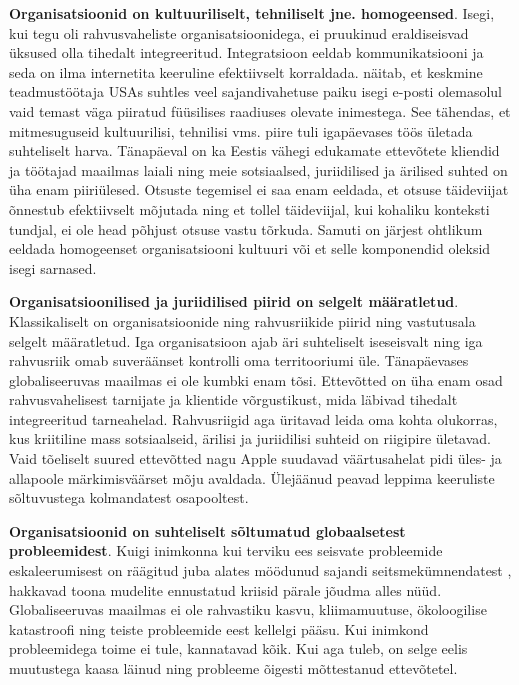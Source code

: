 \textbf{Organisatsioonid on kultuuriliselt, tehniliselt jne. homogeensed}. Isegi, kui tegu oli rahvusvaheliste organisatsioonidega, ei pruukinud eraldiseisvad üksused olla tihedalt integreeritud. Integratsioon eeldab kommunikatsiooni ja seda on ilma internetita keeruline efektiivselt korraldada. \citeauthor{cfmcommnetworks}\cite{cfmcommnetworks} näitab, et keskmine teadmustöötaja USAs suhtles veel sajandivahetuse paiku isegi e-posti olemasolul vaid temast väga piiratud füüsilises raadiuses olevate inimestega. See tähendas, et mitmesuguseid kultuurilisi, tehnilisi vms. piire tuli igapäevases töös ületada suhteliselt harva. Tänapäeval on ka Eestis vähegi edukamate ettevõtete kliendid ja töötajad maailmas laiali ning meie sotsiaalsed, juriidilised ja ärilised suhted on üha enam piiriülesed. Otsuste tegemisel ei saa enam eeldada, et otsuse täideviijat õnnestub efektiivselt mõjutada ning et tollel täideviijal, kui kohaliku konteksti tundjal, ei ole head põhjust otsuse vastu tõrkuda. Samuti on järjest ohtlikum eeldada homogeenset organisatsiooni kultuuri või et selle komponendid oleksid isegi sarnased.

\textbf{Organisatsioonilised ja juriidilised piirid on selgelt määratletud}. Klassikaliselt on organisatsioonide ning rahvusriikide piirid ning vastutusala selgelt määratletud. Iga organisatsioon ajab äri suhteliselt iseseisvalt ning iga rahvusriik omab suveräänset kontrolli oma territooriumi üle. Tänapäevases globaliseeruvas maailmas ei ole kumbki enam tõsi. Ettevõtted on üha enam osad rahvusvahelisest tarnijate ja klientide võrgustikust, mida läbivad tihedalt integreeritud tarneahelad. Rahvusriigid aga üritavad leida oma kohta olukorras, kus kriitiline mass sotsiaalseid, ärilisi ja juriidilisi suhteid on riigipire ületavad. Vaid tõeliselt suured ettevõtted nagu Apple suudavad väärtusahelat pidi üles- ja allapoole märkimisväärset mõju avaldada. Ülejäänud peavad leppima keeruliste sõltuvustega kolmandatest osapooltest. 

\textbf{Organisatsioonid on suhteliselt sõltumatud globaalsetest probleemidest}. Kuigi inimkonna kui terviku ees seisvate probleemide eskaleerumisest on räägitud juba alates möödunud sajandi seitsmekümnendatest \cite{forrester1971world}, hakkavad toona mudelite ennustatud kriisid pärale jõudma alles nüüd. Globaliseeruvas maailmas ei ole rahvastiku kasvu, kliimamuutuse, ökoloogilise katastroofi ning teiste probleemide eest kellelgi pääsu. Kui inimkond probleemidega toime ei tule, kannatavad kõik. Kui aga tuleb, on selge eelis muutustega kaasa läinud ning probleeme õigesti mõttestanud ettevõtetel. 

